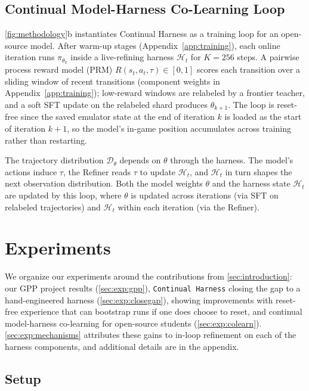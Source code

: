 \documentclass[11pt]{article}
\begin{document}
\subsection{Continual Model-Harness Co-Learning Loop}\label{sec:training}

\cref{fig:methodology}b instantiates Continual Harness as a training loop for an open-source model. After warm-up stages (Appendix~\ref{app:training}), each online iteration runs $\pi_{\theta_k}$ inside a live-refining harness $\mathcal{H}_t$ for $K{=}256$ steps. A pairwise process reward model (PRM) $R(s_t, a_t, \tau) \in [0,1]$ scores each transition over a sliding window of recent transitions (component weights in Appendix~\ref{app:training}); low-reward windows are relabeled by a frontier teacher, and a soft SFT update on the relabeled shard produces $\theta_{k+1}$. The loop is reset-free since the saved emulator state at the end of iteration $k$ is loaded as the start of iteration $k{+}1$, so the model's in-game position accumulates across training rather than restarting.

The trajectory distribution $\mathcal{D}_\theta$ depends on $\theta$ through the harness. The model's actions induce $\tau$, the Refiner reads $\tau$ to update $\mathcal{H}_t$, and $\mathcal{H}_t$ in turn shapes the next observation distribution. Both the model weights $\theta$ and the harness state $\mathcal{H}_t$ are updated by this loop, where $\theta$ is updated across iterations (via SFT on relabeled trajectories) and $\mathcal{H}_t$ within each iteration (via the Refiner).


\section{Experiments}\label{sec:experiments}

We organize our experiments around the contributions from \cref{sec:introduction}: our GPP project results (\cref{sec:exp:gpp}), \texttt{Continual Harness} closing the gap to a hand-engineered harness (\cref{sec:exp:closegap}), showing improvements with reset-free experience that can bootstrap runs if one does choose to reset, and continual model-harness co-learning for open-source students (\cref{sec:exp:colearn}). 
\cref{sec:exp:mechanisms} attributes these gains to in-loop refinement on each of the harness components, and additional details are in the appendix.

\subsection{Setup}\label{sec:exp:setup}
\end{document}
